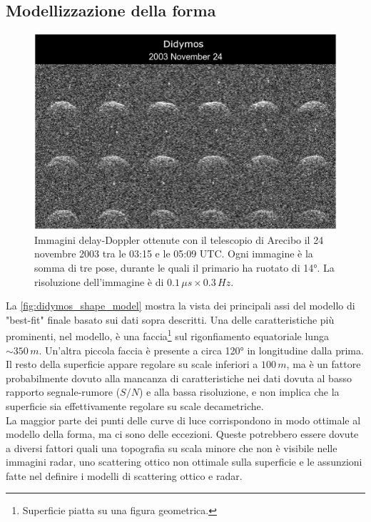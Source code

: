 \documentclass[a4paper,11pt,openright]{book}
\begin{document}
\subsection{Modellizzazione della forma}\label{sec:shape_model}

\begin{figure}[!h]
    \centering
    \includegraphics[scale=1.3]{figure/didymos_241103.jpg}
    \caption[Immagini delay-Doppler ottenute con il telescopio di Arecibo.]{Immagini delay-Doppler ottenute con il telescopio di Arecibo il 24 novembre 2003 tra le 03:15 e le 05:09 UTC. Ogni immagine è la somma di tre pose, durante le quali il primario ha ruotato di 14°. La risoluzione dell'immagine è di $0.1\,\mu s\times 0.3\,Hz$. \citep{naidu_radar_2020}}
    \label{fig:didymos_241103}
\end{figure}

La \cref{fig:didymos_shape_model} mostra la vista dei principali assi del modello di "best-fit" finale basato sui dati sopra descritti. Una delle caratteristiche più prominenti, nel modello, è una faccia\footnote{Superficie piatta su una figura geometrica.} sul rigonfiamento equatoriale lunga $\sim 350\,m$. Un'altra piccola faccia è presente a circa 120° in longitudine dalla prima. Il resto della superficie appare regolare su scale inferiori a $100\,m$, ma è un fattore probabilmente dovuto alla mancanza di caratteristiche nei dati dovuta al basso rapporto segnale-rumore ($S/N$) e alla bassa risoluzione, e non implica che la superficie sia effettivamente regolare su scale decametriche.\\
La maggior parte dei punti delle curve di luce corrispondono in modo ottimale al modello della forma, ma ci sono delle eccezioni. Queste potrebbero essere dovute a diversi fattori quali una topografia su scala minore che non è visibile nelle immagini radar, uno scattering ottico non ottimale sulla superficie e le assunzioni fatte nel definire i modelli di scattering ottico e radar.
\end{document}
